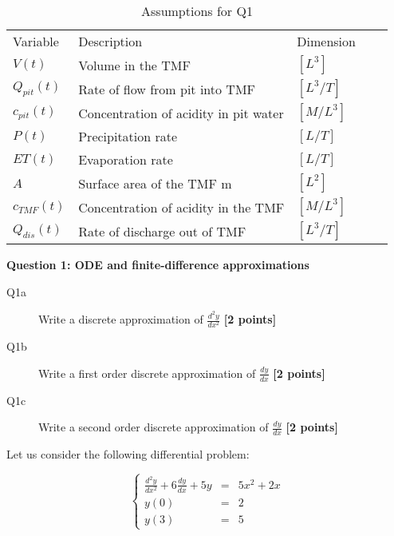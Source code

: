 \documentclass{article}
\begin{document}
\begin{table}[H]
  \caption{Assumptions for Q1}
  \begin{center}
\begin{tabular}{lllll}
Variable & Description    & Dimension  \\
$V(t)$ &  Volume in the TMF                               & $[L^3]$ \\
 $Q_{pit}(t)$    & Rate of flow from pit into TMF      & $[L^3/T]$\\
 $c_{pit}(t)$     & Concentration of acidity in pit water & $[M/L^3]$\\
 $P(t)$            & Precipitation rate                       & $[L/T]$ \\
$ET(t)$          & Evaporation rate                    & $[L/T]$  \\
$A$               & Surface area of the TMF m           &$[L^2]$  \\
 $c_{TMF}(t)$ & Concentration of acidity in the TMF & $[M/L^3]$ \\
 $Q_{dis}(t)$   & Rate of discharge out of TMF      & $[L^3/T]$ 

\end{tabular}
\end{center}
\end{table}



\textbf{Question 1: ODE and finite-difference approximations}

\begin{description}
\item [Q1a] Write a discrete approximation of $\frac{d^2y}{dx^2}$ \textbf{[2 points]}
\vspace{3cm}
\item [Q1b] Write a first order discrete approximation of $\frac{dy}{dx}$ \textbf{[2 points]}
\vspace{3.5cm}

\item [Q1c] Write a second order discrete approximation of $\frac{dy}{dx}$ \textbf{[2 points]}
\vspace{3.5cm}

\end{description}

Let us consider the following differential problem:

\begin{equation}
\left\lbrace
\begin{array}{lll}
\displaystyle{\frac{d^2y}{dx^2}} +6  \displaystyle{\frac{dy}{dx}} + 5y &=& 5x^2 + 2x \\
y(0) &=& 2 \\
y(3) & = & 5
\end{array}
\right. \label{eq:diffprob}
\end{equation}
\end{document}
